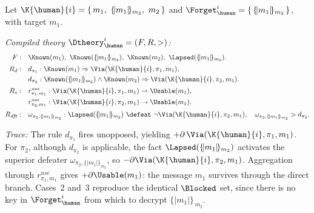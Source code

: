 \begin{example}
\label{Ex:DL-Derivability1}

Let $\K{\human}{i}=\{\,m_1,\ \{\!|m_1|\!\}_{m_2},\ m_2\,\}$ and $\Forget_{\human}^{i}=\{\,\{\!|m_1|\!\}_{m_2}\,\}$, with target $m_1$.

\noindent\emph{Compiled theory $\Dtheory_{\human}^{i}=(F,R,{>})$:}
\begin{align*}
F:\quad & \Known(m_1),\ \Known(\{\!|m_1|\!\}_{m_2}),\ \Known(m_2),\ \Lapsed(\{\!|m_1|\!\}_{m_2}).\\[2pt]
R_d:\quad & d_{\pi_1}: \Known(m_1)\Rightarrow\Via(\K{\human}{i},\pi_1,m_1),\\
          & d_{\pi_2}: \Known(\{\!|m_1|\!\}_{m_2})\wedge\Known(m_2)
                        \Rightarrow\Via(\K{\human}{i},\pi_2,m_1).\\[2pt]
R_s:\quad & r^{\mathit{use}}_{\pi_1,m_1}: \Via(\K{\human}{i},\pi_1,m_1)\to\Usable(m_1),\\
          & r^{\mathit{use}}_{\pi_2,m_1}: \Via(\K{\human}{i},\pi_2,m_1)\to\Usable(m_1).\\[2pt]
R_{\mathit{dft}}:\quad
          & \omega_{\pi_2,\{\!|m_1|\!\}_{m_2}}:
              \Lapsed(\{\!|m_1|\!\}_{m_2})\ \defeat\ \neg\Via(\K{\human}{i},\pi_2,m_1),\quad
              \omega_{\pi_2,\{\!|m_1|\!\}_{m_2}}>d_{\pi_2}.
\end{align*}

\noindent\emph{Trace:}
The rule $d_{\pi_1}$ fires unopposed, yielding $+\partial\,\Via(\K{\human}{i},\pi_1,m_1)$. For $\pi_2$, although $d_{\pi_2}$ is applicable, the fact $\Lapsed(\{\!|m_1|\!\}_{m_2})$ activates the superior defeater $\omega_{\pi_2,\{\!|m_1|\!\}_{m_2}}$, so $-\partial\Via(\K{\human}{i},\pi_2,m_1)$. Aggregation through $r^{\mathit{use}}_{\pi_1,m_1}$ gives $+\partial\Usable(m_1)$: the message $m_1$ survives through the direct branch. Cases~2 and~3 reproduce the identical $\Blocked$ set, since there is no key in $\Forget_{\human}^{i}$ from which to decrypt $\{\!|m_1|\!\}_{\,m_2}$.
\end{example}

